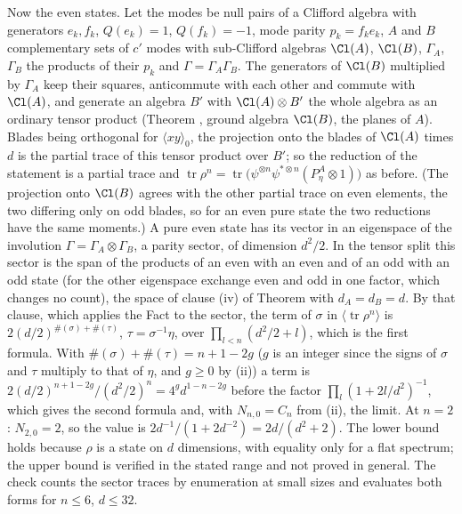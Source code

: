 Now the even states. Let the modes be null pairs of a Clifford algebra with generators $e_{k}, f_{k}$, $Q(e_{k}) = 1$, $Q(f_{k}) = -1$, mode parity $p_{k} = f_{k}e_{k}$, $A$ and $B$ complementary sets of $c'$ modes with sub-Clifford algebras $\Cl(A)$, $\Cl(B)$, $\Gamma_{A}$, $\Gamma_{B}$ the products of their $p_{k}$ and $\Gamma = \Gamma_{A}\Gamma_{B}$. The generators of $\Cl(B)$ multiplied by $\Gamma_{A}$ keep their squares, anticommute with each other and commute with $\Cl(A)$, and generate an algebra $B'$ with $\Cl(A) \otimes B'$ the whole algebra as an ordinary tensor product (Theorem , ground algebra $\Cl(B)$, the planes of $A$). Blades being orthogonal for $\langle xy\rangle_{0}$, the projection onto the blades of $\Cl(A)$ times $d$ is the partial trace of this tensor product over $B'$; so the reduction of the statement is a partial trace and $\operatorname{tr}\rho^{n} = \operatorname{tr}\bigl(\psi^{\otimes n}\psi^{*\otimes n}(P^{A}_{\eta} \otimes 1)\bigr)$ as before. (The projection onto $\Cl(B)$ agrees with the other partial trace on even elements, the two differing only on odd blades, so for an even pure state the two reductions have the same moments.) A pure even state has its vector in an eigenspace of the involution $\Gamma = \Gamma_{A} \otimes \Gamma_{B}$, a parity sector, of dimension $d^{2}/2$. In the tensor split this sector is the span of the products of an even with an even and of an odd with an odd state (for the other eigenspace exchange even and odd in one factor, which changes no count), the space of clause (iv) of Theorem  with $d_{A} = d_{B} = d$. By that clause, which applies the Fact to the sector, the term of $\sigma$ in $\langle\operatorname{tr}\rho^{n}\rangle$ is $2(d/2)^{\#(\sigma)+\#(\tau)}$, $\tau = \sigma^{-1}\eta$, over $\prod_{l<n}(d^{2}/2 + l)$, which is the first formula. With $\#(\sigma) + \#(\tau) = n + 1 - 2g$ ($g$ is an integer since the signs of $\sigma$ and $\tau$ multiply to that of $\eta$, and $g \ge 0$ by (ii)) a term is $2(d/2)^{n+1-2g}/(d^{2}/2)^{n} = 4^{g}d^{1-n-2g}$ before the factor $\prod_{l}(1 + 2l/d^{2})^{-1}$, which gives the second formula and, with $N_{n,0} = C_{n}$ from (ii), the limit. At $n = 2$: $N_{2,0} = 2$, so the value is $2d^{-1}/(1 + 2d^{-2}) = 2d/(d^{2} + 2)$. The lower bound holds because $\rho$ is a state on $d$ dimensions, with equality only for a flat spectrum; the upper bound is verified in the stated range and not proved in general. The check counts the sector traces by enumeration at small sizes and evaluates both forms for $n \le 6$, $d \le 32$.


